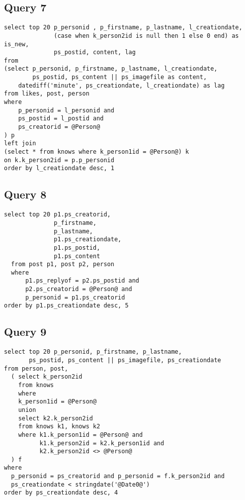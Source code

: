 \subsection{Query 7}
{\footnotesize
\begin{verbatim}
select top 20 p_personid , p_firstname, p_lastname, l_creationdate,
              (case when k_person2id is null then 1 else 0 end) as is_new,
              ps_postid, content, lag
from
(select p_personid, p_firstname, p_lastname, l_creationdate,
        ps_postid, ps_content || ps_imagefile as content,
    datediff('minute', ps_creationdate, l_creationdate) as lag
from likes, post, person
where
    p_personid = l_personid and
    ps_postid = l_postid and
    ps_creatorid = @Person@
) p
left join
(select * from knows where k_person1id = @Person@) k
on k.k_person2id = p.p_personid
order by l_creationdate desc, 1
\end{verbatim}
}
 

\subsection{Query 8}
{\footnotesize
\begin{verbatim}
select top 20 p1.ps_creatorid, 
              p_firstname, 
              p_lastname, 
              p1.ps_creationdate, 
              p1.ps_postid, 
              p1.ps_content
  from post p1, post p2, person
  where
      p1.ps_replyof = p2.ps_postid and
      p2.ps_creatorid = @Person@ and
      p_personid = p1.ps_creatorid
order by p1.ps_creationdate desc, 5
\end{verbatim}
}



\subsection{Query 9}
{\footnotesize
\begin{verbatim}
select top 20 p_personid, p_firstname, p_lastname,
       ps_postid, ps_content || ps_imagefile, ps_creationdate
from person, post,
  ( select k_person2id
    from knows
    where
    k_person1id = @Person@
    union
    select k2.k_person2id
    from knows k1, knows k2
    where k1.k_person1id = @Person@ and
          k1.k_person2id = k2.k_person1id and 
          k2.k_person2id <> @Person@
  ) f
where
  p_personid = ps_creatorid and p_personid = f.k_person2id and
  ps_creationdate < stringdate('@Date0@')
order by ps_creationdate desc, 4
\end{verbatim}
}
 

